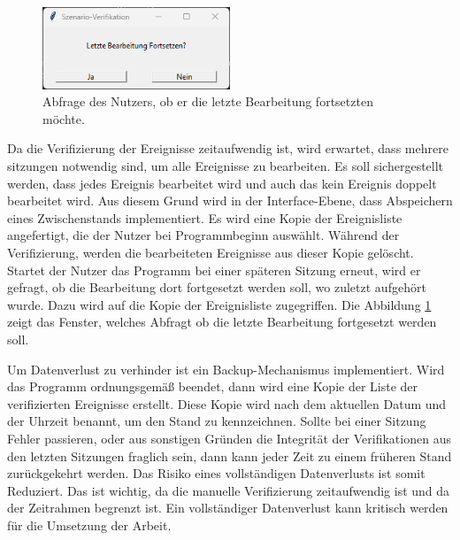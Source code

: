 \begin{figure}
    \begin{center}
        \vspace*{-9mm}
        \includegraphics[width=0.5\textwidth]{img/Verifikationstool/Verifikation Abfrage Letze Bearbeitung fortsetzen.png}
        \vspace*{-10mm}
        \caption{Abfrage des Nutzers, ob er die letzte Bearbeitung fortsetzten möchte.}
        \label{fig:VeriBearbFortsetz}
    \end{center}
\end{figure}
Da die Verifizierung der Ereignisse zeitaufwendig ist, wird erwartet, dass mehrere sitzungen notwendig sind, um alle Ereignisse zu bearbeiten. Es soll sichergestellt werden, dass jedes Ereignis bearbeitet wird und auch das kein Ereignis doppelt bearbeitet wird. Aus diesem Grund wird in der Interface-Ebene, dass Abspeichern eines Zwischenstands implementiert. Es wird eine Kopie der Ereignisliste angefertigt, die der Nutzer bei Programmbeginn auswählt. Während der Verifizierung, werden die bearbeiteten Ereignisse aus dieser Kopie gelöscht. Startet der Nutzer das Programm bei einer späteren Sitzung erneut, wird er gefragt, ob die Bearbeitung dort fortgesetzt werden soll, wo zuletzt aufgehört wurde. Dazu wird auf die Kopie der Ereignisliste zugegriffen. Die Abbildung \ref{fig:VeriBearbFortsetz} zeigt das Fenster, welches Abfragt ob die letzte Bearbeitung fortgesetzt werden soll. \par

Um Datenverlust zu verhinder ist ein Backup-Mechanismus implementiert. Wird das Programm ordnungsgemäß beendet, dann wird eine Kopie der Liste der verifizierten Ereignisse erstellt. Diese Kopie wird nach dem aktuellen Datum und der Uhrzeit benannt, um den Stand zu kennzeichnen. Sollte bei einer Sitzung Fehler passieren, oder aus sonstigen Gründen die Integrität der Verifikationen aus den letzten Sitzungen fraglich sein, dann kann jeder Zeit zu einem früheren Stand zurückgekehrt werden. Das Risiko eines vollständigen Datenverlusts ist somit Reduziert. Das ist wichtig, da die manuelle Verifizierung zeitaufwendig ist und da der Zeitrahmen begrenzt ist. Ein vollständiger Datenverlust kann kritisch werden für die Umsetzung der Arbeit. 